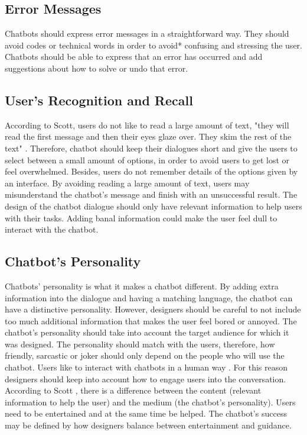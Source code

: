 \documentclass[a4paper,10pt]{article}
\begin{document}
\subsection*{Error Messages}

Chatbots should express error messages in a straightforward way. They should avoid codes or technical words in order to avoid* confusing and stressing the user. Chatbots should be able to express that an error has occurred and add suggestions about how to solve or undo that error.  

\subsection*{User's Recognition and Recall}

According to Scott, users do not like to read a large amount of text, "they will read the first message and then their eyes glaze over. They skim the rest of the text" \cite{HeuristicsWebPage}. Therefore, chatbot should keep their dialogues short and give the users to select between a small amount of options, in order to avoid users to get lost or feel overwhelmed. Besides, users do not remember details of the options given by an interface. By avoiding reading a large amount of text, users may misunderstand the chatbot's message and finish with an unsuccessful result. The design of the chatbot dialogue should only have relevant information to help users with their tasks. Adding banal information could make the user feel dull to interact with the chatbot. 

\subsection*{Chatbot's Personality}

Chatbots' personality is what it makes a chatbot different. By adding extra information into the dialogue and having a matching language, the chatbot can have a distinctive personality. However, designers should be careful to not include too much additional information that makes the user feel bored or annoyed. The chatbot's personality should take into account the target audience for which it was designed. The personality should match with the users, therefore, how friendly, sarcastic or  joker should only depend on the people who will use the chatbot. Users like to interact with chatbots in a human way \cite{HeuristicsWebPage}. For this reason designers should keep into account how to engage users into the conversation. According to Scott \cite{HeuristicsWebPage}, there is a difference between the content (relevant information to help the user) and the medium (the chatbot's personality). Users need to be entertained and at the same time be helped.  The chatbot's success may be defined by how designers balance between entertainment and guidance. 
\end{document}
